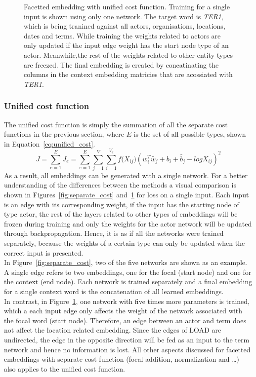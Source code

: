 \begin{figure}
{\small 
{} %

\caption{Facetted embedding with unified cost function. Training for a single input is shown using only one network. The target word is \emph{TER1}, which is being tranined against all actors, organisations, locations, dates and terms. While training the weights related to actors are only updated if the input edge weight has the start node type of an actor. Meanwhile,the rest of the weights related to other entity-types are freezed. The final embedding is created by concatinating the columns in the context embedding matricies that are acossiated with \emph{TER1}.} \label{fig:unified_cost}
}
\end{figure}
\subsubsection{Unified cost function  }
\label{sec:unified_cost}
The unified cost function is simply the summation of all the separate cost functions in the previous section, where $E$ is the set of all possible types, shown in Equation~\ref{eq:unified_cost}.
\begin{equation}
J=\sum _{ e=1 }^{ E }{J_e}=\sum _{ e=1 }^{ E }{}\sum _{ j=1 }^{ V }{}\sum _{ i=1 }^{ V_e }{ f({ X }_{ ij } } )(w_{ i }^{ T }\tilde{  w_{ j } } +b_{ i }+\tilde{  b_{ j } } -log{ X }_{ ij })^2
\label{eq:unified_cost}
\end{equation}
As a result, all embeddings can be generated with a single network. For a better understanding of the differences between the methods a visual comparison is shown in Figures~\ref{fig:separate_cost} and~\ref{fig:unified_cost} for loss on a single input. Each input is an edge with its corresponding weight, if the input has the starting node of type actor, the rest of the layers related to other types of embeddings will be frozen during training and only the weights for the actor network will be updated through backpropagation. Hence, it is as if all the networks were trained separately, because the weights of a certain type can only be updated when the correct input is presented.  \\
In Figure~\ref{fig:separate_cost}, two of the five networks are shown as an example. A single edge refers to two embeddings, one for the focal (start node) and one for the context (end node). Each network is trained separately and a final embedding for a single context word is the concatenation of all learned embeddings. \\
In contrast, in Figure~\ref{fig:unified_cost}, one network with five times more parameters is trained, which a each input edge only affects the weight of the network associated with the focal word (start node). Therefore, an edge between an actor and term does not affect the location related embedding. Since the edges of LOAD are undirected, the edge in the opposite direction will be fed as an input to the term network and hence no information is lost. All other aspects discussed for facetted embeddings with separate cost function (focal addition, normalization and \dots) also applies to the unified cost function. 

